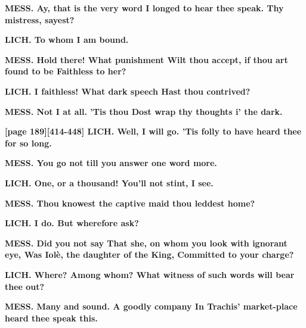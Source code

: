 \documentclass[11pt,letter]{book}
\begin{document}
\par \textbf{MESS. Ay, that is the very word I longed to hear thee speak. Thy mistress, sayest?}
\par 

\par \textbf{LICH. To whom I am bound.}
\par 

\par \textbf{MESS. Hold there! What punishment Wilt thou accept, if thou art found to be Faithless to her?}
\par 

\par \textbf{LICH. I faithless! What dark speech Hast thou contrived?}
\par 

\par \textbf{MESS. Not I at all. ’Tis thou Dost wrap thy thoughts i’ the dark.}
\par 

\par \textbf{[page 189][414-448] LICH. Well, I will go. ’Tis folly to have heard thee for so long.}
\par 

\par \textbf{MESS. You go not till you answer one word more.}
\par 

\par \textbf{LICH. One, or a thousand! You’ll not stint, I see.}
\par 

\par \textbf{MESS. Thou knowest the captive maid thou leddest home?}
\par 

\par \textbf{LICH. I do. But wherefore ask?}
\par 

\par \textbf{MESS. Did you not say That she, on whom you look with ignorant eye, Was Iolè, the daughter of the King, Committed to your charge?}
\par 

\par \textbf{LICH. Where? Among whom? What witness of such words will bear thee out?}
\par 

\par \textbf{MESS. Many and sound. A goodly company In Trachis’ market-place heard thee speak this.}
\par 
\end{document}
